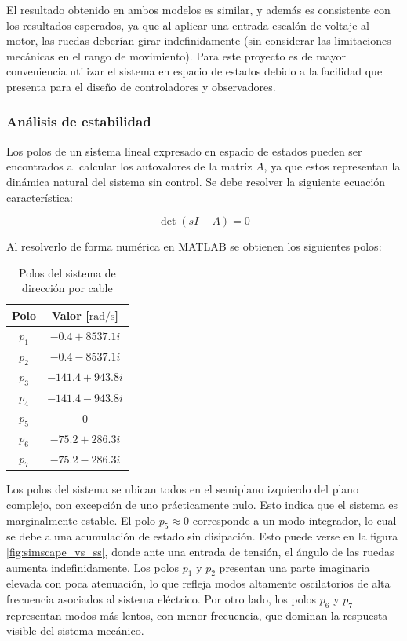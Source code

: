 \documentclass{article}
\begin{document}
El resultado obtenido en ambos modelos es similar, y además es consistente con los resultados esperados, ya que al aplicar una entrada escalón de voltaje al motor, las ruedas deberían girar indefinidamente (sin considerar las limitaciones mecánicas en el rango de movimiento). Para este proyecto es de mayor conveniencia utilizar el sistema en espacio de estados debido a la facilidad que presenta para el diseño de controladores y observadores.

\subsubsection{Análisis de estabilidad}

Los polos de un sistema lineal expresado en espacio de estados pueden ser encontrados al calcular los autovalores de la matriz $A$, ya que estos representan la dinámica natural del sistema sin control. Se debe resolver la siguiente ecuación característica:

\begin{equation}
    \det(sI - A) = 0
\end{equation}

Al resolverlo de forma numérica en MATLAB se obtienen los siguientes polos:

\begin{table}[H]
\small
\centering
\caption{Polos del sistema de dirección por cable}
\label{tab:polos_modelo}
\begin{tabular}{c c}
\toprule
\textbf{Polo} & \textbf{Valor [$\mathrm{rad/s}$]} \\
\midrule
$p_1$ & $-0.4 + 8537.1i$ \\
$p_2$ & $-0.4 - 8537.1i$ \\
$p_3$ & $-141.4 + 943.8i$ \\
$p_4$ & $-141.4 - 943.8i$ \\
$p_5$ & $0$ \\
$p_6$ & $-75.2 + 286.3i$ \\
$p_7$ & $-75.2 - 286.3i$ \\
\bottomrule
\end{tabular}
\end{table}

Los polos del sistema se ubican todos en el semiplano izquierdo del plano complejo, con excepción de uno prácticamente nulo. Esto indica que el sistema es marginalmente estable. El polo $p_5 \approx 0$ corresponde a un modo integrador, lo cual se debe a una acumulación de estado sin disipación. Esto puede verse en la figura \ref{fig:simscape_vs_ss}, donde ante una entrada de tensión, el ángulo de las ruedas aumenta indefinidamente. Los polos $p_1$ y $p_2$ presentan una parte imaginaria elevada con poca atenuación, lo que refleja modos altamente oscilatorios de alta frecuencia asociados al sistema eléctrico. Por otro lado, los polos $p_6$ y $p_7$ representan modos más lentos, con menor frecuencia, que dominan la respuesta visible del sistema mecánico.
\end{document}
